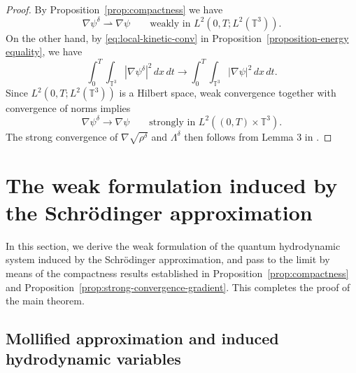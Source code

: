 \documentclass[11pt]{article}
\begin{document}
\begin{proof}
By Proposition~\ref{prop:compactness} we have 
\[
\nabla\psi^\delta \rightharpoonup \nabla\psi
\qquad\text{weakly in } L^2(0,T;L^2( \mathbb{T}^3)).
\]
On the other hand, by \eqref{eq:local-kinetic-conv} in Proposition~\ref{proposition-energy equality},  we have 
\[
\int_0^T\int_{\mathbb{T}^3} |\nabla\psi^\delta|^2\,dx\,dt
\to
\int_0^T\int_{\mathbb{T}^3} |\nabla\psi|^2\,dx\,dt.
\]
Since \(L^2(0,T;L^2( \mathbb{T}^3))\)  is a Hilbert space, weak convergence together with convergence of norms implies
\[
\nabla\psi^\delta \to \nabla\psi
\qquad\text{strongly in }L^2((0,T)\times \mathbb{T}^3).
\]
The strong convergence of \(\nabla\sqrt{\rho^\delta}\) and \(\Lambda^\delta\) then follows from Lemma 3 in \cite{AntonelliMarcati2009}.

\end{proof}















\section{The weak formulation induced by the Schr\"odinger approximation}
\label{sec:induced}

In this section, we derive the weak formulation of the quantum hydrodynamic system induced by the Schr\"odinger approximation, and pass to the limit by means of the compactness results established in Proposition~\ref{prop:compactness} and Proposition~\ref{prop:strong-convergence-gradient}. This completes the proof of the main theorem.

\subsection{Mollified approximation and induced hydrodynamic variables}
\end{document}
